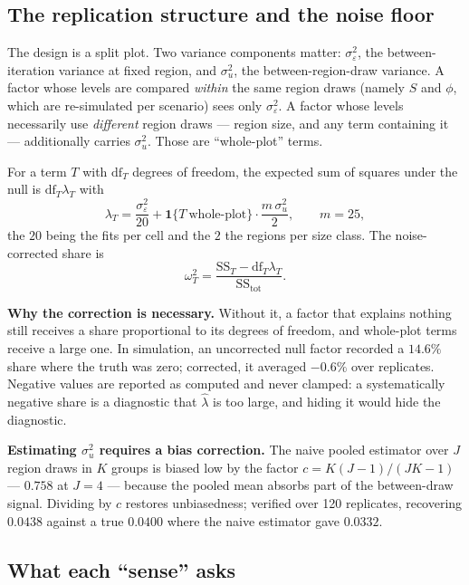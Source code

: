 \subsection{The replication structure and the noise floor}\label{sec:noise}

The design is a split plot. Two variance components matter:
$\sigma^2_\varepsilon$, the between-iteration variance at fixed region, and
$\sigma^2_u$, the between-region-draw variance. A factor whose levels are
compared \emph{within} the same region draws (namely $S$ and $\phi$, which are
re-simulated per scenario) sees only $\sigma^2_\varepsilon$. A factor whose
levels necessarily use \emph{different} region draws --- region size, and any
term containing it --- additionally carries $\sigma^2_u$. Those are
``whole-plot'' terms.

For a term $T$ with $\mathrm{df}_T$ degrees of freedom, the expected sum of
squares under the null is $\mathrm{df}_T\lambda_T$ with
\begin{equation}
\lambda_T=\frac{\sigma^2_\varepsilon}{20}
+\mathbf{1}\{T\ \text{whole-plot}\}\cdot\frac{m\,\sigma^2_u}{2},
\qquad m=25 ,
\end{equation}
the $20$ being the fits per cell and the $2$ the regions per size class. The
noise-corrected share is
\begin{equation}
\omega^2_T=\frac{\mathrm{SS}_T-\mathrm{df}_T\lambda_T}{\mathrm{SS}_{\text{tot}}} .
\label{eq:omega}
\end{equation}

\textbf{Why the correction is necessary.} Without it, a factor that explains
nothing still receives a share proportional to its degrees of freedom, and
whole-plot terms receive a large one. In simulation, an uncorrected null factor
recorded a $14.6\%$ share where the truth was zero; corrected, it averaged
$-0.6\%$ over replicates. Negative values are reported as computed and never
clamped: a systematically negative share is a diagnostic that
$\hat\lambda$ is too large, and hiding it would hide the diagnostic.

\textbf{Estimating $\sigma^2_u$ requires a bias correction.} The naive pooled
estimator over $J$ region draws in $K$ groups is biased low by the factor
$c=K(J-1)/(JK-1)$ --- $0.758$ at $J=4$ --- because the pooled mean absorbs part
of the between-draw signal. Dividing by $c$ restores unbiasedness; verified over
120 replicates, recovering $0.0438$ against a true $0.0400$ where the naive
estimator gave $0.0332$.

\subsection{What each ``sense'' asks}\label{sec:senses}

